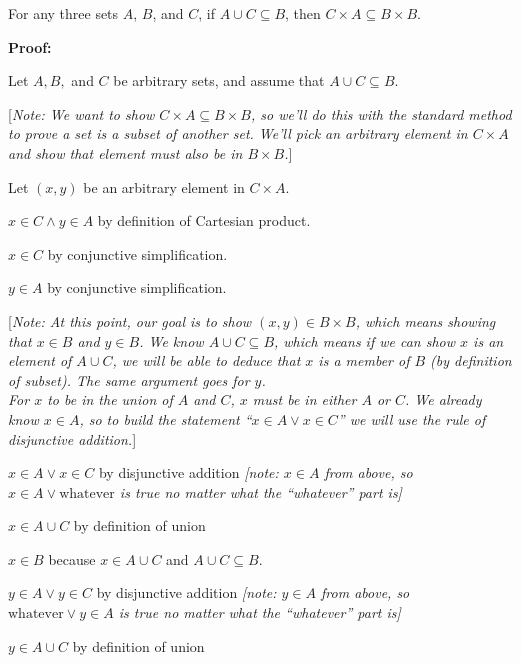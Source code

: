 \documentclass[11pt, letterpaper]{report}
\newcommand{\proofnote}[1]{[\textit{Note: #1}]}
\begin{document}
\begin{enumerate}
        For any three sets $A$, $B$, and $C$, if $A \cup C \subseteq B$, then
        $C \times A \subseteq B \times B$.
        
        
        
        \textbf{Proof:}
        
        Let $A, B, $ and $C$ be arbitrary sets, and assume that $A \cup C \subseteq B$.
        
        \proofnote{We want to show $C \times A \subseteq B \times B$, so we'll do this with the standard method to prove a set is a subset of another set.  We'll pick an arbitrary
        element in $C \times A$ and show that element must also be in $B \times B$.}
        
        Let $(x,y)$ be an arbitrary element in $C \times A$.
        
        $x\in C \land y \in A$ by definition of Cartesian product.
        
        $x \in C$ by conjunctive simplification.
        
        $y \in A$ by conjunctive simplification.
        
        \proofnote{At this point, our goal is to show $(x,y) \in B \times B$, which means showing that
        $x \in B$ and $y \in B$.  We know $A \cup C \subseteq B$, which means if we can show $x$ is an element of $A \cup C$, we will be able to deduce that $x$ is a member of $B$ (by definition of subset).  The same argument goes for $y$. 
        \vspace{.2in}\\
        For $x$ to be in the union of $A$ and $C$, $x$ must be in either $A$ or $C$.  We already know $x \in A$,
        so to build the statement ``$x \in A \lor x \in C$'' we will use the rule of disjunctive addition.}
        
        $x \in A \lor x \in C$ by disjunctive addition \emph{[note: $x \in A$ from above, so $x \in A \lor \text{whatever}$ is true no matter what the ``whatever'' part is]}
        
        $x \in A \cup C$ by definition of union
        
        $x \in B$ because $x \in A \cup C$ and $A\cup C \subseteq B$.
        
        $y \in A \lor y\in C$ by disjunctive addition \emph{[note: $y \in A$ from above, so $\text{whatever} \lor y \in A$ is true no matter what the ``whatever'' part is]}
        
        $y \in A \cup C$ by definition of union
        

\end{enumerate}
\end{document}
